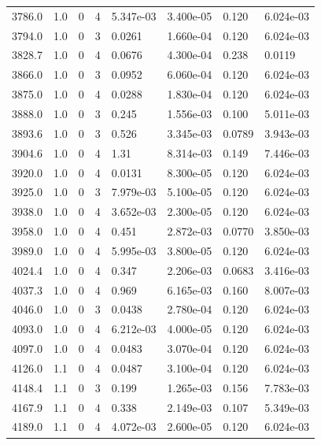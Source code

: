 \documentclass[preview]{standalone}
\begin{document}
{{{{{{{\begin{tabular}{L{1.2cm}C{1.2cm} C{0.3cm}C{0.5cm} C{1.4cm}C{1.4cm} C{1.4cm}C{1.4cm}}
  3786.0  &   1.0  & 0     &  4 &  5.347e-03  & 3.400e-05  & 0.120 &  6.024e-03   \\ 
  3794.0  &   1.0  & 0     &  3 &  0.0261  & 1.660e-04  & 0.120 &  6.024e-03   \\ 
  3828.7  &   1.0  & 0     &  4 &  0.0676  & 4.300e-04  & 0.238 &  0.0119   \\ 
  3866.0  &   1.0  & 0     &  3 &  0.0952  & 6.060e-04  & 0.120 &  6.024e-03   \\ 
  3875.0  &   1.0  & 0     &  4 &  0.0288  & 1.830e-04  & 0.120 &  6.024e-03   \\ 
  3888.0  &   1.0  & 0     &  3 &  0.245  & 1.556e-03  & 0.100 &  5.011e-03   \\ 
  3893.6  &   1.0  & 0     &  3 &  0.526  & 3.345e-03  & 0.0789 &  3.943e-03   \\ 
  3904.6  &   1.0  & 0     &  4 &  1.31  & 8.314e-03  & 0.149 &  7.446e-03   \\ 
  3920.0  &   1.0  & 0     &  4 &  0.0131  & 8.300e-05  & 0.120 &  6.024e-03   \\ 
  3925.0  &   1.0  & 0     &  3 &  7.979e-03  & 5.100e-05  & 0.120 &  6.024e-03   \\ 
  3938.0  &   1.0  & 0     &  4 &  3.652e-03  & 2.300e-05  & 0.120 &  6.024e-03   \\ 
  3958.0  &   1.0  & 0     &  4 &  0.451  & 2.872e-03  & 0.0770 &  3.850e-03   \\ 
  3989.0  &   1.0  & 0     &  4 &  5.995e-03  & 3.800e-05  & 0.120 &  6.024e-03   \\ 
  4024.4  &   1.0  & 0     &  4 &  0.347  & 2.206e-03  & 0.0683 &  3.416e-03   \\ 
  4037.3  &   1.0  & 0     &  4 &  0.969  & 6.165e-03  & 0.160 &  8.007e-03   \\ 
  4046.0  &   1.0  & 0     &  3 &  0.0438  & 2.780e-04  & 0.120 &  6.024e-03   \\ 
  4093.0  &   1.0  & 0     &  4 &  6.212e-03  & 4.000e-05  & 0.120 &  6.024e-03   \\ 
  4097.0  &   1.0  & 0     &  4 &  0.0483  & 3.070e-04  & 0.120 &  6.024e-03   \\ 
  4126.0  &   1.1  & 0     &  4 &  0.0487  & 3.100e-04  & 0.120 &  6.024e-03   \\ 
  4148.4  &   1.1  & 0     &  3 &  0.199  & 1.265e-03  & 0.156 &  7.783e-03   \\ 
  4167.9  &   1.1  & 0     &  4 &  0.338  & 2.149e-03  & 0.107 &  5.349e-03   \\ 
  4189.0  &   1.1  & 0     &  4 &  4.072e-03  & 2.600e-05  & 0.120 &  6.024e-03   \\ 

\end{tabular}}}}}}}}
\end{document}
